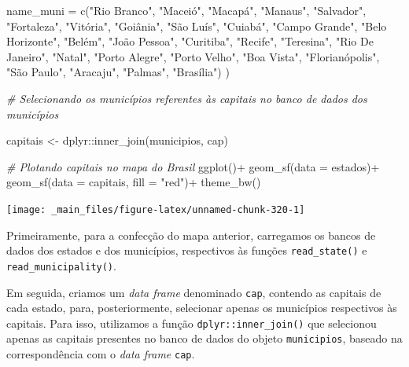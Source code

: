 \documentclass[
  brazilian,
]{book}
\newenvironment{Shaded}{\begin{snugshade}}{\end{snugshade}}
\newcommand{\AttributeTok}[1]{\textcolor[rgb]{0.77,0.63,0.00}{#1}}
\newcommand{\CommentTok}[1]{\textcolor[rgb]{0.56,0.35,0.01}{\textit{#1}}}
\newcommand{\FunctionTok}[1]{\textcolor[rgb]{0.00,0.00,0.00}{#1}}
\newcommand{\NormalTok}[1]{#1}
\newcommand{\OtherTok}[1]{\textcolor[rgb]{0.56,0.35,0.01}{#1}}
\newcommand{\SpecialCharTok}[1]{\textcolor[rgb]{0.00,0.00,0.00}{#1}}
\newcommand{\StringTok}[1]{\textcolor[rgb]{0.31,0.60,0.02}{#1}}
\begin{document}
\begin{Shaded}
\begin{Highlighting}[]
  \AttributeTok{name\_muni =} \FunctionTok{c}\NormalTok{(}\StringTok{"Rio Branco"}\NormalTok{, }\StringTok{"Maceió"}\NormalTok{, }\StringTok{"Macapá"}\NormalTok{, }\StringTok{"Manaus"}\NormalTok{, }\StringTok{"Salvador"}\NormalTok{, }\StringTok{"Fortaleza"}\NormalTok{, }\StringTok{"Vitória"}\NormalTok{, }\StringTok{"Goiânia"}\NormalTok{, }\StringTok{"São Luís"}\NormalTok{, }\StringTok{"Cuiabá"}\NormalTok{, }\StringTok{"Campo Grande"}\NormalTok{, }\StringTok{"Belo Horizonte"}\NormalTok{, }\StringTok{"Belém"}\NormalTok{, }\StringTok{"João Pessoa"}\NormalTok{, }\StringTok{"Curitiba"}\NormalTok{, }\StringTok{"Recife"}\NormalTok{, }\StringTok{"Teresina"}\NormalTok{, }\StringTok{"Rio De Janeiro"}\NormalTok{, }\StringTok{"Natal"}\NormalTok{, }\StringTok{"Porto Alegre"}\NormalTok{, }\StringTok{"Porto Velho"}\NormalTok{, }\StringTok{"Boa Vista"}\NormalTok{, }\StringTok{"Florianópolis"}\NormalTok{, }\StringTok{"São Paulo"}\NormalTok{, }\StringTok{"Aracaju"}\NormalTok{, }\StringTok{"Palmas"}\NormalTok{, }\StringTok{"Brasília"}\NormalTok{)}
\NormalTok{)}

\CommentTok{\# Selecionando os municípios referentes às capitais no banco de dados dos municípios}

\NormalTok{capitais }\OtherTok{\textless{}{-}}\NormalTok{ dplyr}\SpecialCharTok{::}\FunctionTok{inner\_join}\NormalTok{(municipios, cap)}


\CommentTok{\# Plotando capitais no mapa do Brasil}
\FunctionTok{ggplot}\NormalTok{()}\SpecialCharTok{+}
  \FunctionTok{geom\_sf}\NormalTok{(}\AttributeTok{data =}\NormalTok{ estados)}\SpecialCharTok{+}
  \FunctionTok{geom\_sf}\NormalTok{(}\AttributeTok{data =}\NormalTok{ capitais, }\AttributeTok{fill =} \StringTok{"red"}\NormalTok{)}\SpecialCharTok{+}
  \FunctionTok{theme\_bw}\NormalTok{()}
\end{Highlighting}
\end{Shaded}

\begin{center}\texttt{[image: \_main\_files/figure-latex/unnamed-chunk-320-1]} \end{center}

Primeiramente, para a confecção do mapa anterior, carregamos os bancos de dados dos estados e dos municípios, respectivos às funções \texttt{read\_state()} e \texttt{read\_municipality()}.

Em seguida, criamos um \emph{data frame} denominado \texttt{cap}, contendo as capitais de cada estado, para, posteriormente, selecionar apenas os municípios respectivos às capitais. Para isso, utilizamos a função \texttt{dplyr::inner\_join()} que selecionou apenas as capitais presentes no banco de dados do objeto \texttt{municipios}, baseado na correspondência com o \emph{data frame} \texttt{cap}.
\end{document}
